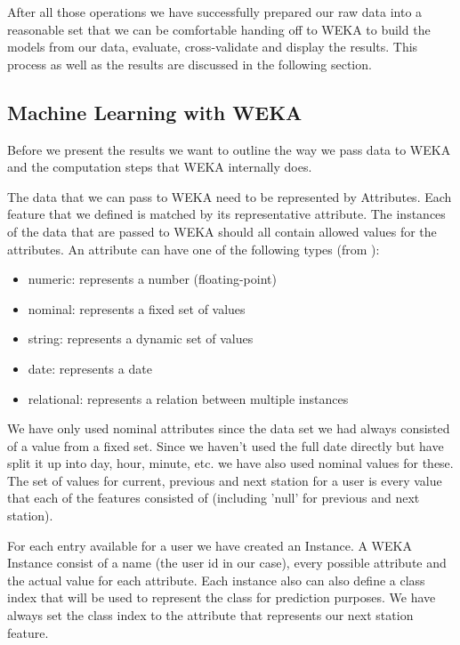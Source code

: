 After all those operations we have successfully prepared our raw data into a reasonable set that we can be comfortable handing off to WEKA to build the models from our data, evaluate, cross-validate and display the results. This process as well as the results are discussed in the following section.

\subsection{Machine Learning with WEKA}
Before we present the results we want to outline the way we pass data to WEKA and the computation steps that WEKA internally does.

The data that we can pass to WEKA need to be represented by Attributes. Each feature that we defined is matched by its representative attribute. The instances of the data that are passed to WEKA should all contain allowed values for the attributes. An attribute can have one of the following types (from \cite{WEKAJavaDocAttribute}):
\begin{itemize}
	\item numeric: represents a number (floating-point)
	\item nominal: represents a fixed set of values
	\item string: represents a dynamic set of values
	\item date: represents a date
	\item relational: represents a relation between multiple instances
\end{itemize}


We have only used nominal attributes since the data set we had always consisted of a value from a fixed set. Since we haven't used the full date directly but have split it up into day, hour, minute, etc. we have also used nominal values for these. The set of values for current, previous and next station for a user is every value that each of the features consisted of (including 'null' for previous and next station).

For each entry available for a user we have created an Instance. A WEKA Instance consist of a name (the user id in our case), every possible attribute and the actual value for each attribute. Each instance also can also define a class index that will be used to represent the class for prediction purposes. We have always set the class index to the attribute that represents our next station feature.

